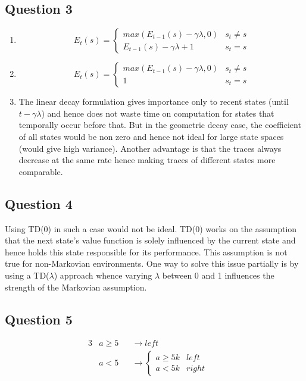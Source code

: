 \documentclass[12pt]{extarticle}
\begin{document}
\subsection{Question 3}
\begin{enumerate}[label=(\alph*)]
\item 
\[
E_t(s) = 
\begin{cases}
 max(E_{t-1}(s) - \gamma\lambda,0) & s_t \neq s \\
 E_{t-1}(s) - \gamma\lambda + 1 & s_t = s
\end{cases}
\]

\item 
\[
E_t(s) = 
\begin{cases}
 max(E_{t-1}(s) - \gamma\lambda,0) & s_t \neq s \\
 1 & s_t = s
\end{cases}
\]

\item The linear decay formulation gives importance only to recent states (until $t-\gamma\lambda$) and hence does not waste time on computation for states that temporally occur before that. But in the geometric decay case, the coefficient of all states would be non zero and hence not ideal for large state spaces (would give high variance). Another advantage is that the traces always decrease at the same rate hence making traces of different states more comparable.
\end{enumerate}

\subsection{Question 4}
Using TD(0) in such a case would not be ideal. TD(0) works on the assumption that the next state's value function is solely influenced by the current state and hence holds this state responsible for its performance. This assumption is not true for non-Markovian environments.
One way to solve this issue partially is by using a TD($\lambda$) approach whence varying $\lambda$ between 0 and 1 influences the strength of the Markovian assumption.

\subsection{Question 5}
\begin{alignat*}{3}
  & a \geq 5 &&\rightarrow left && \\
  & a < 5 &&\rightarrow
\begin{cases}
 a \geq 5k & left \\
 a < 5k & right
\end{cases}
\end{alignat*}
\end{document}
